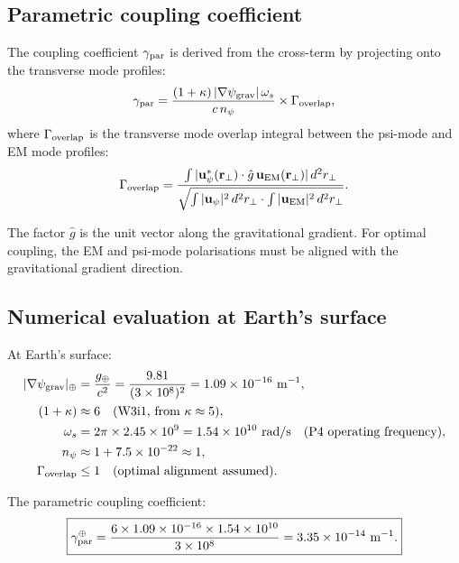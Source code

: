 \documentclass[11pt]{article}
\newcommand{\ee}[1]{\times 10^{#1}}
\newcommand{\psigrav}{\psi_{\rm grav}}
\newcommand{\npsi}{n_\psi}
\begin{document}
\subsection{Parametric coupling coefficient}

The coupling coefficient $\gamma_{\rm par}$ is derived from the
cross-term by projecting onto the transverse mode profiles:
\begin{equation}
\gamma_{\rm par} = \frac{(1+\kappa)\,|\nabla\psigrav|\,\omega_s}{c\,\npsi}
\times \Gamma_{\rm overlap},
\label{eq:gamma-par}
\end{equation}
where $\Gamma_{\rm overlap}$ is the transverse mode overlap integral
between the psi-mode and EM mode profiles:
\begin{equation}
\Gamma_{\rm overlap} = \frac{\int |\mathbf{u}_\psi^*(\mathbf{r}_\perp)
\cdot\hat{g}\,\mathbf{u}_{\rm EM}(\mathbf{r}_\perp)|\,d^2r_\perp}
{\sqrt{\int|\mathbf{u}_\psi|^2\,d^2r_\perp
\cdot\int|\mathbf{u}_{\rm EM}|^2\,d^2r_\perp}}.
\label{eq:mode-overlap}
\end{equation}

The factor $\hat{g}$ is the unit vector along the gravitational gradient.
For optimal coupling, the EM and psi-mode polarisations must be aligned
with the gravitational gradient direction.

\subsection{Numerical evaluation at Earth's surface}

At Earth's surface:
\begin{align}
|\nabla\psigrav|_\oplus &= \frac{g_\oplus}{c^2}
= \frac{9.81}{(3\ee{8})^2} = 1.09\ee{-16}~\text{m}^{-1}, \\
(1+\kappa) &\approx 6 \quad\text{(W3i1, from $\kappa \approx 5$)}, \\
\omega_s &= 2\pi \times 2.45\ee{9} = 1.54\ee{10}~\text{rad/s}
  \quad\text{(P4 operating frequency)}, \\
\npsi &\approx 1 + 7.5\ee{-22} \approx 1, \\
\Gamma_{\rm overlap} &\leq 1 \quad\text{(optimal alignment assumed)}.
\end{align}

The parametric coupling coefficient:
\begin{equation}
\boxed{
\gamma_{\rm par}^{\oplus} = \frac{6 \times 1.09\ee{-16}
\times 1.54\ee{10}}{3\ee{8}}
= 3.35\ee{-14}~\text{m}^{-1}.
}
\label{eq:gamma-par-Earth}
\end{equation}
\end{document}
